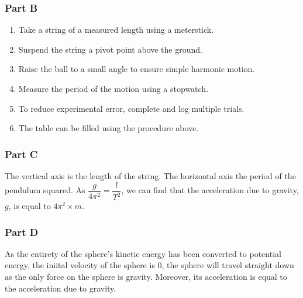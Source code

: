 \documentclass[]{scrartcl}
\begin{document}
\subsubsection*{Part B}
\begin{enumerate}
  \item Take a string of a measured length using a meterstick.
  \item Suspend the string a pivot point above the ground.
  \item Raise the ball to a small angle to ensure simple harmonic motion.
  \item Measure the period of the motion using a stopwatch.
  \item To reduce experimental error, complete and log multiple trials.
  \item The table can be filled using the procedure above.
\end{enumerate}
\subsubsection*{Part C}
The vertical axis is the length of the string. The horizontal axis the period of the pendulum squared. As $\dfrac{g}{4\pi^2} = \dfrac{l}{T^2}$, we can find that the acceleration due to gravity, $g$, is equal to $4\pi^2 \times m$.
\subsubsection*{Part D}
As the entirety of the sphere's kinetic energy has been converted to potential energy, the iniital velocity of the sphere is 0, the sphere will travel straight down as the only force on the sphere is gravity. Moreover, its acceleration is equal to the acceleration due to gravity.
\end{document}
